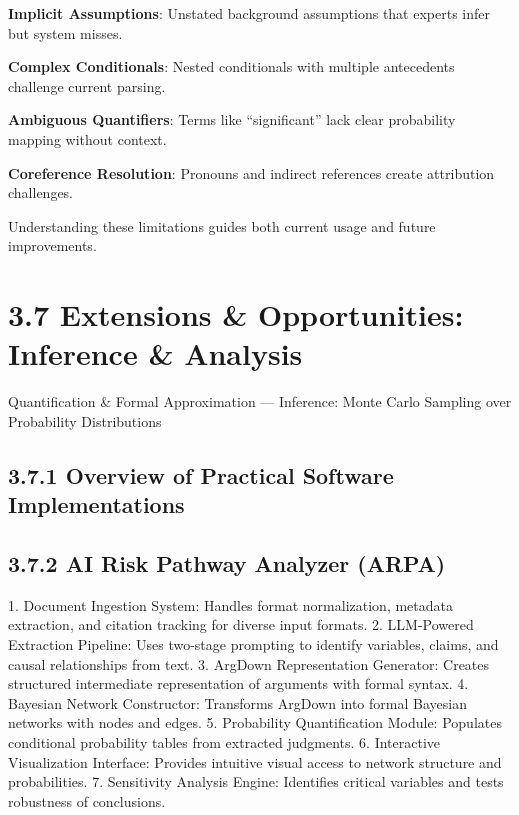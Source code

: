 \documentclass[
  11pt,
  letterpaper,
]{book}
\begin{document}
\textbf{Implicit Assumptions}: Unstated background assumptions that
experts infer but system misses.

\textbf{Complex Conditionals}: Nested conditionals with multiple
antecedents challenge current parsing.

\textbf{Ambiguous Quantifiers}: Terms like ``significant'' lack clear
probability mapping without context.

\textbf{Coreference Resolution}: Pronouns and indirect references create
attribution challenges.

Understanding these limitations guides both current usage and future
improvements.

\section*{3.7 Extensions \& Opportunities: Inference \&
Analysis}\label{extensions-opportunities-inference-analysis}


Quantification \& Formal Approximation --- Inference: Monte Carlo
Sampling over Probability Distributions

\subsection*{3.7.1 Overview of Practical Software
Implementations}\label{overview-of-practical-software-implementations}

\subsection*{\texorpdfstring{3.7.2 \textbf{AI Risk Pathway Analyzer
(ARPA)}}{3.7.2 AI Risk Pathway Analyzer (ARPA)}}\label{ai-risk-pathway-analyzer-arpa}

1. Document Ingestion System: Handles format normalization, metadata
extraction, and citation tracking for diverse input formats. 2.
LLM-Powered Extraction Pipeline: Uses two-stage prompting to identify
variables, claims, and causal relationships from text. 3. ArgDown
Representation Generator: Creates structured intermediate representation
of arguments with formal syntax. 4. Bayesian Network Constructor:
Transforms ArgDown into formal Bayesian networks with nodes and edges.
5. Probability Quantification Module: Populates conditional probability
tables from extracted judgments. 6. Interactive Visualization Interface:
Provides intuitive visual access to network structure and probabilities.
7. Sensitivity Analysis Engine: Identifies critical variables and tests
robustness of conclusions.
\end{document}
